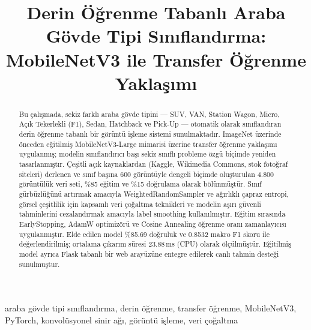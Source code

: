 \documentclass[conference]{IEEEtran}
\begin{document}
\title{Derin Öğrenme Tabanlı Araba Gövde Tipi Sınıflandırma:\\
MobileNetV3 ile Transfer Öğrenme Yaklaşımı}

\author{
\and
{}
}

\maketitle

\begin{abstract}
Bu çalışmada, sekiz farklı araba gövde tipini — SUV, VAN, Station Wagon,
Micro, Açık Tekerlekli (F1), Sedan, Hatchback ve Pick-Up — otomatik olarak
sınıflandıran derin öğrenme tabanlı bir görüntü işleme sistemi sunulmaktadır.
ImageNet üzerinde önceden eğitilmiş MobileNetV3-Large mimarisi üzerine
transfer öğrenme yaklaşımı uygulanmış; modelin sınıflandırıcı başı sekiz
sınıflı probleme özgü biçimde yeniden tasarlanmıştır. Çeşitli açık
kaynaklardan (Kaggle, Wikimedia Commons, stok fotoğraf siteleri) derlenen
ve sınıf başına 600 görüntüyle dengeli biçimde oluşturulan 4.800 görüntülük
veri seti, \%85 eğitim ve \%15 doğrulama olarak bölünmüştür.
Sınıf gürbüzlüğünü artırmak amacıyla WeightedRandomSampler ve ağırlıklı
çapraz entropi, görsel çeşitlilik için kapsamlı veri çoğaltma teknikleri
ve modelin aşırı güvenli tahminlerini cezalandırmak amacıyla label
smoothing kullanılmıştır. Eğitim sırasında EarlyStopping, AdamW
optimizörü ve Cosine Annealing öğrenme oranı zamanlayıcısı uygulanmıştır.
Elde edilen model \%85.69 doğruluk ve 0.8532 makro F1 skoru ile
değerlendirilmiş; ortalama çıkarım süresi 23.88\,ms (CPU) olarak
ölçülmüştür. Eğitilmiş model ayrıca Flask tabanlı bir web arayüzüne
entegre edilerek canlı tahmin desteği sunulmuştur.
\end{abstract}

\begin{IEEEkeywords}
araba gövde tipi sınıflandırma, derin öğrenme, transfer öğrenme,
MobileNetV3, PyTorch, konvolüsyonel sinir ağı, görüntü işleme,
veri çoğaltma
\end{IEEEkeywords}
\end{document}
